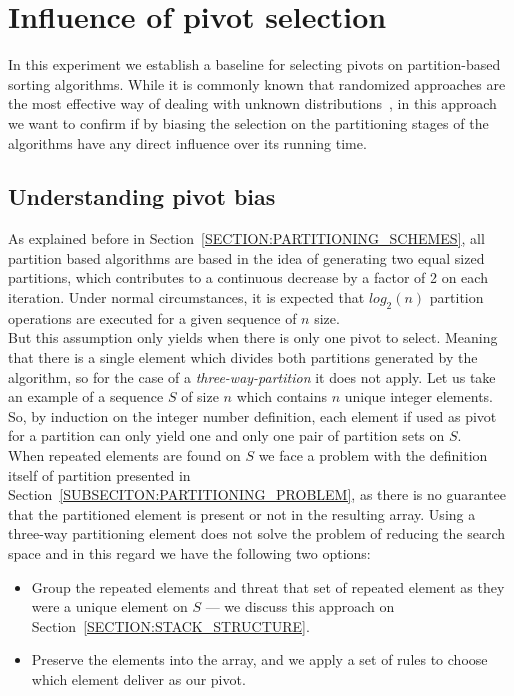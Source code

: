 \section{Influence of pivot selection}

In this experiment we establish a baseline for selecting pivots on partition-based sorting algorithms. While it is commonly known that randomized approaches are the most effective way of dealing with unknown distributions~\cite{estivil92}, in this approach we want to confirm if by biasing the selection on the partitioning stages of the algorithms have any direct influence over its running time.\\

\subsection{Understanding pivot bias}

As explained before in Section~\ref{SECTION:PARTITIONING_SCHEMES}, all partition based algorithms are based in the idea of generating two equal sized partitions, which contributes to a continuous decrease by a factor of 2 on each iteration. Under normal circumstances, it is expected that $log_2(n)$ partition operations are executed for a given sequence of $n$ size.\\

But this assumption only yields when there is only one pivot to select. Meaning that there is a single element which divides both partitions generated by the algorithm, so for the case of a \emph{three-way-partition} it does not apply. Let us take an example of a sequence $S$ of size $n$ which contains $n$ unique integer elements. So, by induction on the integer number definition, each element if used as pivot for a partition can only yield one and only one pair of partition sets on $S$.\\

When repeated elements are found on $S$ we face a problem with the definition itself of partition presented in Section~\ref{SUBSECITON:PARTITIONING_PROBLEM}, as there is no guarantee that the partitioned element is present or not in the resulting array. Using a three-way partitioning element does not solve the problem of reducing the search space and in this regard we have the following two options:

\begin{itemize}
    \item Group the repeated elements and threat that set of repeated element as they were a unique element on $S$ --- we discuss this approach on Section~\ref{SECTION:STACK_STRUCTURE}.
    \item Preserve the elements into the array, and we apply a set of rules to choose which element deliver as our pivot.
\end{itemize}

